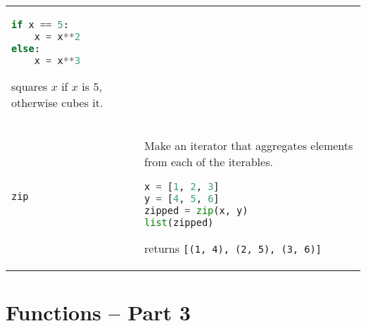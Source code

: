 \begin{tabular}[]{@{}ll@{}}
\begin{minipage}[t]{0.77\columnwidth}
\begin{lstlisting}[language=Python]
if x == 5:
    x = x**2
else:
    x = x**3
\end{lstlisting}

squares \(x\) if \(x\) is \(5\), otherwise cubes it.
\end{minipage}\tabularnewline
\begin{minipage}[t]{0.17\columnwidth}\raggedright
\lstinline!zip!
\end{minipage} & \begin{minipage}[t]{0.77\columnwidth}\raggedright
Make an iterator that aggregates elements from each of the iterables.

\begin{lstlisting}[language=Python]
x = [1, 2, 3]
y = [4, 5, 6]
zipped = zip(x, y)
list(zipped)
\end{lstlisting}

returns \lstinline![(1, 4), (2, 5), (3, 6)]!
\end{minipage}\tabularnewline
\bottomrule
\end{tabular}

\section{Functions -- Part 3}\label{functions_pt3}

